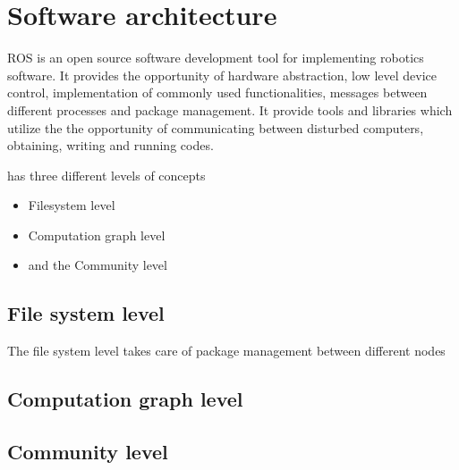 \section{Software architecture}

\gls{ROS} is an open source software development tool for implementing robotics software. It provides the opportunity of hardware abstraction, low level device control, implementation of commonly used functionalities, messages between different processes and package management\cite{wiki_ros}. It provide tools and libraries which utilize the the opportunity of communicating between disturbed computers, obtaining, writing and running codes.


 has three different levels of concepts\cite{Wiki_ros_concepts}

\begin{itemize}
\item Filesystem level
\item Computation graph level
\item and the Community level
\end{itemize}

\subsection*{File system level}
The file system level takes care of package management between different nodes 
\subsection*{Computation graph level}

\subsection*{Community level}





